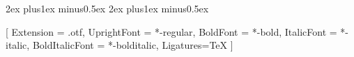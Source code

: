 \usepackage[amsmath,hyperref]{ntheorem}
\theorempreskipamount 2ex plus1ex minus0.5ex
\theorempostskipamount 2ex plus1ex minus0.5ex
\theoremstyle{break}
\newtheorem{definition}{Definition}[chapter]




\ifluatex
  \usepackage[no-math]{fontspec}
  \usepackage{unicode-math}

  \setmainfont{texgyretermes}[
    Extension = .otf,
    UprightFont = *-regular,
    BoldFont = *-bold,
    ItalicFont = *-italic,
    BoldItalicFont = *-bolditalic,
    Ligatures=TeX
  ]
  \setsansfont[Scale=.9]{TeX Gyre Heros}
  \ifwindows
    \setmonofont[StylisticSet={1,3},Scale=.9]{Inconsolata}
  \else
    \setmonofont[StylisticSet={1,3},Scale=.9]{Inconsolatazi4}
  \fi

\else
  \RequirePackage{newtxtext}
  \RequirePackage{newtxmath}
  \RequirePackage[zerostyle=b,scaled=.9]{newtxtt}

  \usepackage[T1]{fontenc}
\fi



